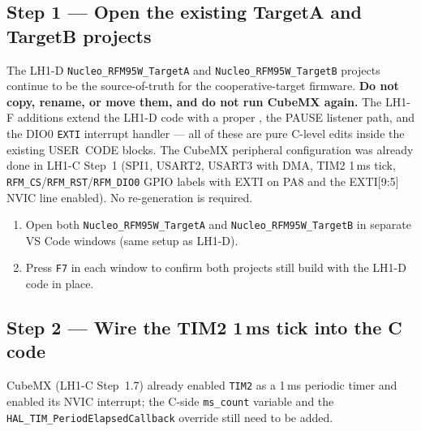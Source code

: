 \documentclass[11pt,letterpaper]{article}
\begin{document}
\subsection{Step 1 --- Open the existing TargetA and TargetB projects}

The LH1-D \texttt{Nucleo\_RFM95W\_TargetA} and \texttt{Nucleo\_RFM95W\_TargetB} projects continue to be the source-of-truth for the cooperative-target firmware. \textbf{Do not copy, rename, or move them, and do not run CubeMX again.} The LH1-F additions extend the LH1-D code with a proper \FSM{}, the PAUSE listener path, and the DIO0 \texttt{EXTI} interrupt handler --- all of these are pure C-level edits inside the existing USER~CODE blocks. The CubeMX peripheral configuration was already done in LH1-C Step~1 (SPI1, USART2, USART3 with DMA, TIM2 1\,ms tick, \texttt{RFM\_CS}/\texttt{RFM\_RST}/\texttt{RFM\_DIO0} GPIO labels with EXTI on PA8 and the EXTI[9:5] NVIC line enabled). No re-generation is required.

\begin{enumerate}[leftmargin=2em]
	\item Open both \texttt{Nucleo\_RFM95W\_TargetA} and \texttt{Nucleo\_RFM95W\_TargetB} in separate VS Code windows (same setup as LH1-D).
	\item Press \texttt{F7} in each window to confirm both projects still build with the LH1-D code in place.
\end{enumerate}

\subsection{Step 2 --- Wire the TIM2 1\,ms tick into the C code}

CubeMX (LH1-C Step~1.7) already enabled \texttt{TIM2} as a 1\,ms periodic timer and enabled its NVIC interrupt; the C-side \texttt{ms\_count} variable and the \texttt{HAL\_TIM\_PeriodElapsedCallback} override still need to be added.
\end{document}
